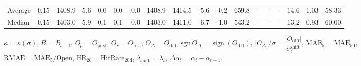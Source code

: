 \begin{threeparttable}
{\begin{tabular}{lrrrrrrrrrrrrrrrrr}
Average &     0.15 & 1408.9 &               5.6 &               0.0 &                0.0 &               -0.0 & 1408.9 & 1414.5 &       -5.6 &                     -0.2 &               659.8 &         -- &        -- &             -- &             14.6 &            1.03 &                  58.33 \\
 Median &     0.15 & 1403.0 &               5.9 &               0.1 &                0.1 &               -0.0 & 1403.0 & 1411.0 &       -6.7 &                     -1.0 &               543.2 &         -- &        -- &             -- &             13.2 &            0.93 &                  60.00 \\
\bottomrule
\end{tabular}
}
\begin{tablenotes}\footnotesize
\item $\kappa=\kappa(\sigma)$, $B=B_{t-1}$, $O_p=O_{\text{pred}}$, $O_r=O_{\text{real}}$, $O_\Delta=O_{\text{diff}}$, $\mathrm{sgn}\,O_\Delta=\operatorname{sign}(O_{\text{diff}})$, $|O_\Delta|/\sigma=\dfrac{|O_{\text{diff}}|}{\sigma_t^{\text{shift}}}$, $\mathrm{MAE}_5=\mathrm{MAE}_{5\text{d}}$, $\mathrm{RMAE}= \mathrm{MAE}_5 / \text{Open}$, $\mathrm{HR}_{20}=\mathrm{HitRate}_{20\text{d}}$, 
$\lambda_{\text{shift}}=\lambda_t$, 
$\Delta\alpha_t=\alpha_t-\alpha_{t-1}$.
\end{tablenotes}
\end{threeparttable}
\endgroup

